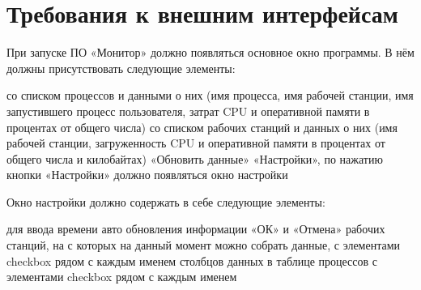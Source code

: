 \section{Требования к внешним интерфейсам }
При запуске ПО «Монитор» должно появляться основное окно программы. В нём должны присутствовать следующие элементы:
\begin{itemize}
 со списком процессов и данными о них (имя процесса, имя рабочей станции, имя запустившего процесс пользователя, затрат CPU и оперативной памяти в процентах от общего числа)
 со списком рабочих станций и данных о них (имя рабочей станции, загруженность CPU и оперативной памяти в процентах от общего числа и килобайтах)
 «Обновить данные»
 «Настройки», по нажатию кнопки «Настройки» должно появляться окно настройки
\end{itemize}

Окно настройки должно содержать в себе следующие элементы:
\begin{itemize}
 для ввода времени авто обновления информации
 «ОК» и «Отмена»
 рабочих станций, на с которых на данный момент можно собрать данные, с элементами checkbox рядом с каждым именем
 столбцов данных в таблице процессов с элементами checkbox рядом с каждым именем
\end{itemize}
